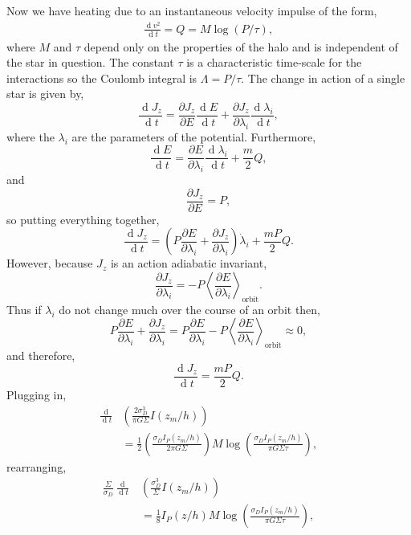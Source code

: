 \documentclass[usenatbib]{mnras}
\renewcommand{\d}[1]{\! \mathrm{d}#1 \:}
\newcommand{\deriv}[2]{\frac{\d{#1}}{\d{#2}}}
\newcommand{\pderiv}[2]{\frac{\partial{#1}}{\partial{#2}}}
\newcommand{\EV}[1]{\left< #1 \right>}
\renewcommand{\d}[1]{\ensuremath{\operatorname{d}\!{#1}}}
\begin{document}
Now we have heating due to an instantaneous velocity impulse of the form,
\begin{align*}
\deriv{v^2}{t} = Q = M \log{(P / \tau)},
\end{align*}  
where $M$ and $\tau$ depend only on the properties of the halo and is independent of the star in question. The constant $\tau$ is a characteristic time-scale for the interactions so the Coulomb integral is $\Lambda = P / \tau$. The change in action of a single star is given by,
\begin{equation}
\deriv{J_z}{t} = \pderiv{J_z}{E} \deriv{E}{t} + \pderiv{J_z}{\lambda_i} \deriv{\lambda_i}{t},
\end{equation}
where the $\lambda_i$ are the parameters of the potential. Furthermore,
\begin{equation}
\deriv{E}{t} = \pderiv{E}{\lambda_i} \deriv{\lambda_i}{t} + \frac{m}{2} Q,
\end{equation}
and 
\begin{equation}
\pderiv{J_z}{E} = P,
\end{equation}
so putting everything together,
\begin{equation}
 \deriv{J_z}{t} = \left( P \pderiv{E}{\lambda_i} + \pderiv{J_z}{\lambda_i} \right) \dot{\lambda}_i + \frac{mP}{2} Q.
\end{equation}
However, because $J_z$ is an action adiabatic invariant,
\begin{equation}
\pderiv{J_z}{\lambda_i} = - P \EV{\pderiv{E}{\lambda_i}}_{\text{orbit}}.
\end{equation}
Thus if $\lambda_i$ do not change much over the course of an orbit then,
\begin{equation}
P \pderiv{E}{\lambda_i} + \pderiv{J_z}{\lambda_i}  =  P \pderiv{E}{\lambda_i} - P \EV{\pderiv{E}{\lambda_i}}_{\text{orbit}}  \approx 0,
\end{equation}
and therefore,
\begin{equation}
\deriv{J_z}{t} = \frac{m P}{2} Q.
\end{equation}
Plugging in,
\begin{align}
\deriv{}{t} & \left( \frac{2 \sigma_D^3}{\pi G \Sigma} I(z_m / h) \right) 
\\
& = \frac{1}{2} \left( \frac{\sigma_D I_P(z_m / h)}{2 \pi G \Sigma} \right) M \log{\left( \frac{\sigma_D I_P(z_m / h)}{\pi G \Sigma \tau}  \right)}, \nonumber
\end{align}
rearranging,
\begin{align}
\frac{\Sigma} {\sigma_D} \deriv{}{t} & \left( \frac{\sigma_D^3}{\Sigma} I(z_m / h) \right) 
\\
& = \frac{1}{8}  I_P(z / h) M \log{\left( \frac{\sigma_D I_P(z_m / h)}{\pi G \Sigma \tau} \right)}, \nonumber
\end{align}
\end{document}
